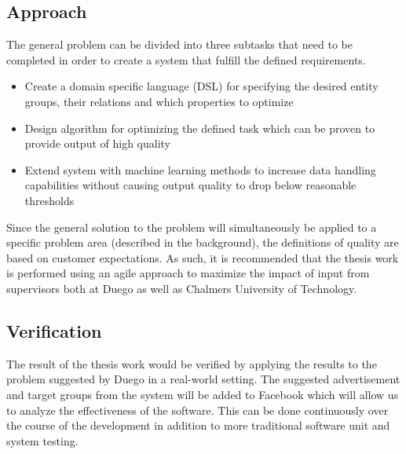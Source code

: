 \documentclass[a4paper]{article}
\begin{document}
\subsection{Approach}
\label{sec:approach}
The general problem can be divided into three subtasks that need to be completed in order to create a system that fulfill the
defined requirements.
\begin{itemize}
	\item Create a domain specific language (DSL) for specifying the desired entity groups, their relations and which
	properties to optimize
	\item Design algorithm for optimizing the defined task which can be proven to provide output of high quality
	\item Extend system with machine learning methods to increase data handling capabilities without causing output quality to
	 drop below reasonable thresholds
\end{itemize}
Since the general solution to the problem will simultaneously be applied to a specific problem area (described in the
background), the definitions of quality are based on customer expectations. As such, it is recommended that the thesis work is
performed using an agile approach to maximize the impact of input from supervisors both at Duego as well as Chalmers University
of Technology.

\subsection{Verification}
The result of the thesis work would be verified by applying the results to the problem suggested by Duego in a real-world setting.
 The suggested advertisement and target groups from the system will be added to Facebook which will allow us to analyze the
 effectiveness of the software. This can be done continuously over the course of the development in addition to more traditional
 software unit and system testing.


\end{document}
